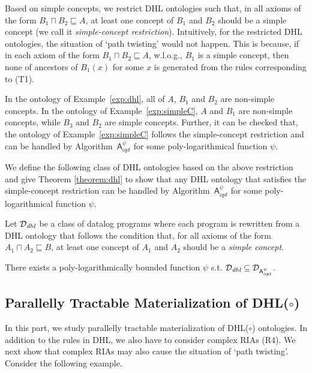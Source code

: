 Based on simple concepts, we restrict DHL ontologies such that, in all axioms of the
form $B_1\sqcap B_2\sqsubseteq A$, at least one concept of $B_1$ and $B_2$ should be a simple concept
(we call it \emph{simple-concept restriction}).
Intuitively, for the restricted DHL ontologies, the situation of `path twisting' would not happen.
This is because, if in each axiom of the form $B_1\sqcap B_2\sqsubseteq A$, w.l.o.g., $B_1$
is a simple concept, then none of ancestors of $B_1(x)$ for some $x$
is generated from the rules corresponding to (T1).

\begin{example}
In the ontology of Example~\ref{exp:dhl}, all of $A$, $B_1$ and $B_2$ are
non-simple concepts.
In the ontology of Example~\ref{exp:simpleC}, $A$ and $B_1$ are non-simple concepts,
while $B_3$ and $B_2$ are simple concepts. Further, it can be checked that,
the ontology  of Example~\ref{exp:simpleC} follows the simple-concept restriction
and can be handled by Algorithm~$\mathsf{A}_{opt}^\psi$ for some poly-logarithmical function $\psi$.
\end{example}

We define the following class of DHL ontologies based on the above restriction and
give Theorem \ref{theorem:dhl} to show that any DHL ontology that satisfies the
simple-concept restriction can be handled by Algorithm~$\mathsf{A}^\psi_{opt}$
for some poly-logarithmical function $\psi$.

\begin{definition} Let $\mathcal{D}_{\textit{\text{dhl}}}$ be a class of datalog programs where
each program is rewritten from a DHL ontology that follows the condition that, for all axioms of the form
$A_1\sqcap A_2\sqsubseteq B$, at least one concept of $A_1$ and $A_2$ should be a \emph{simple concept}.
\end{definition}

\begin{theorem}\label{theorem:dhl}
There exists a poly-logarithmically bounded function $\psi$ s.t.
$\mathcal{D}_{\textit{\text{dhl}}}\subseteq\mathcal{D}_{\mathsf{A}_{opt}^{\psi}}$.
\end{theorem}


\subsection{Parallelly Tractable Materialization of DHL($\circ$)}
\label{sec:DHLo}

In this part, we study parallelly tractable materialization
of DHL($\circ$) ontologies.
In addition to the rules in DHL, we also have to consider complex RIAs (R4).
We next show that complex RIAs may also cause the situation of `path twisting'.
Consider the following example.


